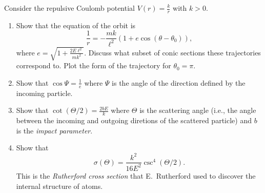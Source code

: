 \documentclass{jhwhw}
\begin{document}
Consider the repulsive Coulomb potential $V(r) = \frac{k}r$ with $k>0$.
\begin{enumerate}
  \item Show that the equation of the orbit is
        \begin{equation}
          \label{eq:5}
          \frac{1}r = - \frac{m k}{\ell^{2}}(1 + e \cos(\theta - \theta_{0})),
        \end{equation}
        where $e = \sqrt{1 + \frac{2 E \ell^{2}}{m k^{2}}}$. Discuss what subset of conic sections these trajectories correspond to.
        Plot the form of the trajectory for $\theta_{0} = \pi$.
  \item Show that $\cos \Psi = \frac1e$ where $\Psi$ is the angle of the direction defined by the incoming particle.
  \item Show that $\cot(\Theta/2) = \frac{2 b E}{k}$ where $\Theta$ is the scattering angle (i.e., the angle between the incoming and outgoing diretions of the scattered particle) and $b$ is the \emph{impact parameter}.
  \item Show that
        \begin{equation}
          \label{eq:6}
          \sigma(\Theta) = \frac{k^{2}}{16 E^{2}} \csc^{4}(\Theta/2).
        \end{equation}
        This is the \emph{Rutherford cross section} that E.~Rutherford used to discover the internal structure of atoms.
\end{enumerate}
\end{document}
